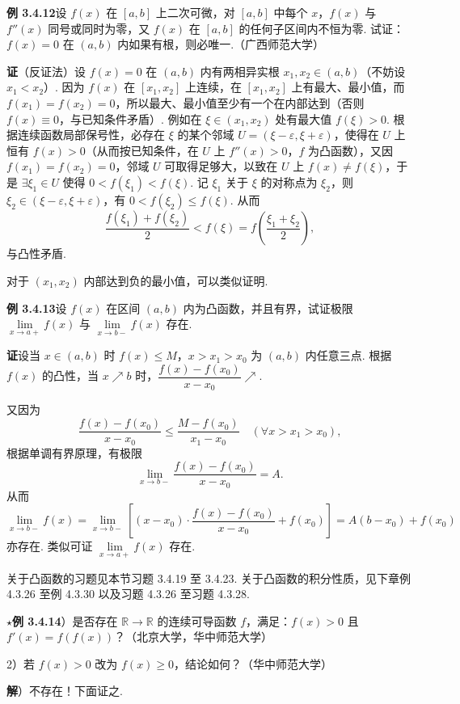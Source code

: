 \documentclass[UTF8,12pt,a4paper,fontset=fandol]{ctexart}
\begin{document}
\noindent\textbf{例 3.4.12}\quad 设 $f(x)$ 在 $[a,b]$ 上二次可微，对 $[a,b]$ 中每个 $x$，$f(x)$ 与 $f''(x)$ 同号或同时为零，又 $f(x)$ 在 $[a,b]$ 的任何子区间内不恒为零. 试证：$f(x)=0$ 在 $(a,b)$ 内如果有根，则必唯一.（广西师范大学）

\noindent\textbf{证}\quad （反证法）设 $f(x)=0$ 在 $(a,b)$ 内有两相异实根 $x_1,x_2\in(a,b)$（不妨设 $x_1<x_2$）. 因为 $f(x)$ 在 $[x_1,x_2]$ 上连续，在 $[x_1,x_2]$ 上有最大、最小值，而 $f(x_1)=f(x_2)=0$，所以最大、最小值至少有一个在内部达到（否则 $f(x)\equiv0$，与已知条件矛盾）. 例如在 $\xi\in(x_1,x_2)$ 处有最大值 $f(\xi)>0$. 根据连续函数局部保号性，必存在 $\xi$ 的某个邻域 $U=(\xi-\varepsilon,\xi+\varepsilon)$，使得在 $U$ 上恒有 $f(x)>0$（从而按已知条件，在 $U$ 上 $f''(x)>0$，$f$ 为凸函数），又因 $f(x_1)=f(x_2)=0$，邻域 $U$ 可取得足够大，以致在 $U$ 上 $f(x)\ne f(\xi)$，于是 $\exists\xi_1\in U$ 使得 $0<f(\xi_1)<f(\xi)$. 记 $\xi_1$ 关于 $\xi$ 的对称点为 $\xi_2$，则 $\xi_2\in(\xi-\varepsilon,\xi+\varepsilon)$，有 $0<f(\xi_2)\le f(\xi)$. 从而
\[
  \frac{f(\xi_1)+f(\xi_2)}2<f(\xi)
  =f\left(\frac{\xi_1+\xi_2}2\right),
\]
与凸性矛盾.

对于 $(x_1,x_2)$ 内部达到负的最小值，可以类似证明.

\noindent\textbf{例 3.4.13}\quad 设 $f(x)$ 在区间 $(a,b)$ 内为凸函数，并且有界，试证极限 $\lim\limits_{x\to a+}f(x)$ 与 $\lim\limits_{x\to b-}f(x)$ 存在.

\noindent\textbf{证}\quad 设当 $x\in(a,b)$ 时 $f(x)\le M$，$x>x_1>x_0$ 为 $(a,b)$ 内任意三点. 根据 $f(x)$ 的凸性，当 $x\nearrow b$ 时，$\dfrac{f(x)-f(x_0)}{x-x_0}\nearrow$.

又因为
\[
  \frac{f(x)-f(x_0)}{x-x_0}
  \le \frac{M-f(x_0)}{x_1-x_0}\quad(\forall x>x_1>x_0),
\]
根据单调有界原理，有极限
\[
  \lim_{x\to b-}\frac{f(x)-f(x_0)}{x-x_0}=A.
\]
从而
\[
  \lim_{x\to b-}f(x)
  =\lim_{x\to b-}\left[(x-x_0)\cdot\frac{f(x)-f(x_0)}{x-x_0}+f(x_0)\right]
  =A(b-x_0)+f(x_0)
\]
亦存在. 类似可证 $\lim\limits_{x\to a+}f(x)$ 存在.

关于凸函数的习题见本节习题 3.4.19 至 3.4.23. 关于凸函数的积分性质，见下章例 4.3.26 至例 4.3.30 以及习题 4.3.26 至习题 4.3.28.

\noindent\textbf{$\star$例 3.4.14}）是否存在 $\mathbb R\to\mathbb R$ 的连续可导函数 $f$，满足：$f(x)>0$ 且 $f'(x)=f(f(x))$？（北京大学，华中师范大学）

2）若 $f(x)>0$ 改为 $f(x)\ge0$，结论如何？（华中师范大学）

\noindent\textbf{解}）不存在！下面证之.
\end{document}
